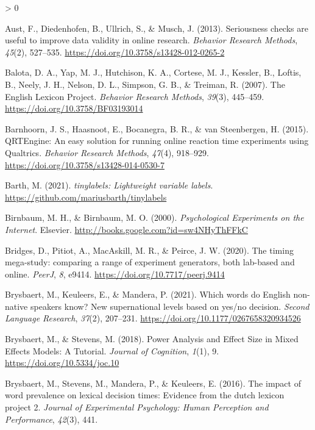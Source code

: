 \documentclass[
  english,
  man,floatsintext]{apa6}
\newlength{\cslhangindent}
\newenvironment{CSLReferences}[2] %
 {%
  \setlength{\parindent}{0pt}
  \ifodd #1 \everypar{\setlength{\hangindent}{\cslhangindent}}\ignorespaces\fi
  \ifnum #2 > 0
  \setlength{\parskip}{#2\baselineskip}
  \fi
 }%
 {}
\begin{document}
\begin{CSLReferences}{1}{0}
\leavevmode\hypertarget{ref-austSeriousnessChecksAre2013}{}%
Aust, F., Diedenhofen, B., Ullrich, S., \& Musch, J. (2013). Seriousness checks are useful to improve data validity in online research. \emph{Behavior Research Methods}, \emph{45}(2), 527--535. \url{https://doi.org/10.3758/s13428-012-0265-2}

\leavevmode\hypertarget{ref-balota2007}{}%
Balota, D. A., Yap, M. J., Hutchison, K. A., Cortese, M. J., Kessler, B., Loftis, B., Neely, J. H., Nelson, D. L., Simpson, G. B., \& Treiman, R. (2007). The English Lexicon Project. \emph{Behavior Research Methods}, \emph{39}(3), 445--459. \url{https://doi.org/10.3758/BF03193014}

\leavevmode\hypertarget{ref-barnhoorn2015}{}%
Barnhoorn, J. S., Haasnoot, E., Bocanegra, B. R., \& van Steenbergen, H. (2015). QRTEngine: An easy solution for running online reaction time experiments using Qualtrics. \emph{Behavior Research Methods}, \emph{47}(4), 918--929. \url{https://doi.org/10.3758/s13428-014-0530-7}

\leavevmode\hypertarget{ref-R-tinylabels}{}%
Barth, M. (2021). \emph{{tinylabels}: Lightweight variable labels}. \url{https://github.com/mariusbarth/tinylabels}

\leavevmode\hypertarget{ref-birnbaumPsychologicalExperimentsInternet2000a}{}%
Birnbaum, M. H., \& Birnbaum, M. O. (2000). \emph{Psychological {Experiments} on the {Internet}}. {Elsevier}. \url{http://books.google.com?id=sw4NHyThFFkC}

\leavevmode\hypertarget{ref-bridges2020}{}%
Bridges, D., Pitiot, A., MacAskill, M. R., \& Peirce, J. W. (2020). The timing mega-study: comparing a range of experiment generators, both lab-based and online. \emph{PeerJ}, \emph{8}, e9414. \url{https://doi.org/10.7717/peerj.9414}

\leavevmode\hypertarget{ref-brysbaert2021a}{}%
Brysbaert, M., Keuleers, E., \& Mandera, P. (2021). Which words do English non-native speakers know? New supernational levels based on yes/no decision. \emph{Second Language Research}, \emph{37}(2), 207--231. \url{https://doi.org/10.1177/0267658320934526}

\leavevmode\hypertarget{ref-brysbaert2018}{}%
Brysbaert, M., \& Stevens, M. (2018). Power Analysis and Effect Size in Mixed Effects Models: A Tutorial. \emph{Journal of Cognition}, \emph{1}(1), 9. \url{https://doi.org/10.5334/joc.10}

\leavevmode\hypertarget{ref-brysbaert2016impact}{}%
Brysbaert, M., Stevens, M., Mandera, P., \& Keuleers, E. (2016). The impact of word prevalence on lexical decision times: Evidence from the dutch lexicon project 2. \emph{Journal of Experimental Psychology: Human Perception and Performance}, \emph{42}(3), 441.


\end{CSLReferences}
\end{document}
